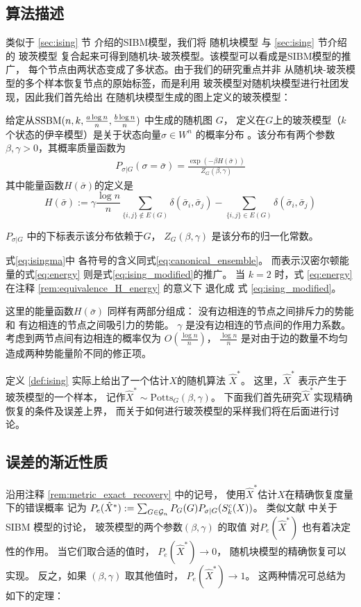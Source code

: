 \subsection{算法描述}
类似于 \ref{sec:ising} 节
介绍的SIBM模型，我们将
随机块模型
与 \ref{sec:ising} 节介绍的 玻茨模型
复合起来可得到随机块-玻茨模型。该模型可以看成是SIBM模型的推广，
每个节点由两状态变成了多状态。由于我们的研究重点并非
从随机块-玻茨模型的多个样本恢复节点的原始标签，而是利用
玻茨模型对随机块模型进行社团发现，因此我们首先给出
在随机块模型生成的图上定义的玻茨模型：
\begin{definition}\label{def:ising}
	给定从$\operatorname{SSBM}(n,k,\frac{a \log n}{n},\frac{b \log n}{n})$ 中生成的随机图 $G$，
    定义在$G$上的玻茨模型（$k$个状态的伊辛模型）是关于状态向量$\sigma\in W^n$ 的概率分布
。该分布有两个参数 $\beta, \gamma>0$，其概率质量函数为
\begin{align} \label{eq:isingma}
	P_{\sigma|G}(\sigma=\bar{\sigma})=\frac{\exp(-\beta H(\bar{\sigma}))}{Z_G(\beta, \gamma)}
	\end{align}
其中能量函数$H(\bar{\sigma})$的定义是
\begin{equation}\label{eq:energy}
	H(\bar{\sigma}) := \gamma \frac{\log n}{n} \sum_{\{i,j\}\not\in E(G)} \delta(\bar{\sigma}_i, \bar{\sigma}_j)
	- \sum_{\{i,j\}\in E(G)} \delta(\bar{\sigma}_i, \bar{\sigma}_j)
	\end{equation}
	
	$P_{\sigma|G}$ 中的下标表示该分布依赖于$G$，
    $Z_G(\beta, \gamma)$ 是该分布的归一化常数。
\end{definition}

式\eqref{eq:isingma}中
各符号的含义同式\eqref{eq:canonical_ensemble}。
而表示汉密尔顿能量的式\eqref{eq:energy}
则是式\eqref{eq:ising_modified}的推广。
当  $k=2$ 时，式 \eqref{eq:energy}
在注释 \ref{rem:equivalence_H_energy} 的意义下
退化成 式 \eqref{eq:ising_modified}。 

这里的能量函数$H(\bar{\sigma})$ 同样有两部分组成：
没有边相连的节点之间排斥力的势能和
有边相连的节点之间吸引力的势能。
$\gamma$ 是没有边相连的节点间的作用力系数。
考虑到两节点间有边相连的概率仅为 $O\left(\frac{\log n}{n} \right)$，
$\frac{\log n}{n}$ 是对由于边的数量不均匀造成两种势能量阶不同的修正项。


定义 \ref{def:ising} 实际上给出了一个估计$X$的随机算法 $\hat{X}^*$。
这里，$\hat{X}^*$ 表示产生于玻茨模型的一个样本，
记作$\hat{X}^* \sim \textrm{Potts}_G(\beta, \gamma)$。
下面我们首先研究$\hat{X}^*$实现精确恢复的条件及误差上界，
而关于如何进行玻茨模型的采样我们将在后面进行讨论。
\subsection{误差的渐近性质}
沿用注释 \ref{rem:metric_exact_recovery} 中的记号，
使用$\hat{X}^*$估计$X$在精确恢复度量下的错误概率
记为 $P_e(\hat{X}^*) := \sum_{G \in \mathcal{G}_n} P_G(G) P_{\sigma | G}(S^c_k(X))$。
类似文献  中关于 SIBM 模型的讨论，
玻茨模型的两个参数$(\beta, \gamma)$ 的取值
对$P_e(\hat{X}^*)$
也有着决定性的作用。
当它们取合适的值时， 
$ P_e(\hat{X}^*)\to 0$，
随机块模型的精确恢复可以实现。
反之，如果 $(\beta, \gamma)$ 取其他值时，
$P_e(\hat{X}^*) \to 1$。
这两种情况可总结为如下的定理：


